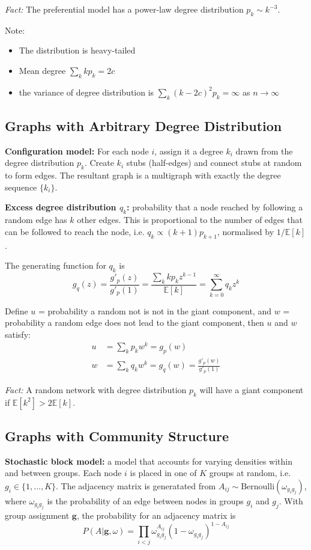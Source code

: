 \documentclass[12pt]{article}
\begin{document}
\textit{Fact:} The preferential model has a power-law degree distribution $p_k \sim k^{-3}$.

Note:
\begin{itemize}
    \item The distribution is heavy-tailed
    \item Mean degree $\sum_k k p_k = 2c$
    \item the variance of degree distribution is $\sum_k (k - 2c)^2 p_k = \infty$ as $n \to \infty$
\end{itemize}

\subsection{Graphs with Arbitrary Degree Distribution}
\textbf{Configuration model:} For each node $i$, assign it a degree $k_i$ drawn from the degree distribution $p_k$. Create $k_i$ stubs (half-edges) and connect stubs at random to form edges. The resultant graph is a multigraph with exactly the degree sequence $\{k_i\}$.

\textbf{Excess degree distribution $q_k$:} probability that a node reached by following a random edge has $k$ other edges. This is proportional to the number of edges that can be followed to reach the node, i.e. $q_k \propto (k + 1)p_{k+1}$, normalised by $1/\mathbb{E}[k]$.

The generating function for $q_k$ is 
$$
g_q(z) = \frac{g'_p(z)}{g'_p(1)} = \frac{\sum_k k p_k z^{k-1}}{\mathbb{E}[k]} = \sum_{k=0}^\infty q_k z^k
$$

Define $u$ = probability a random not is not in the giant component, and $w$ = probability a random edge does not lead to the giant component, then $u$ and $w$ satisfy:
\begin{align*}
    u &= \sum_k p_k w^k = g_p(w) \\
    w &= \sum_k q_k w^k = g_q(w) = \frac{g'_p(w)}{g'_p(1)}
\end{align*}

\textit{Fact:} A random network with degree distribution $p_k$ will have a giant component if $\mathbb{E}[k^2] > 2\mathbb{E}[k]$.

\subsection{Graphs with Community Structure}
\textbf{Stochastic block model:} a model that accounts for varying densities within and between groups. Each node $i$ is placed in one of $K$ groups at random, i.e. $g_i \in \{1, \dots, K\}$. 
The adjacency matrix is generatated from $A_{ij} \sim \text{Bernoulli}(\omega_{g_i g_j})$, where $\omega_{g_i g_j}$ is the probability of an edge between nodes in groups $g_i$ and $g_j$. 
With group assignment $\boldsymbol{g}$, the probability for an adjacency matrix is
$$
P(A| \boldsymbol{g}, \omega) = \prod_{i < j} \omega_{g_i g_j}^{A_{ij}} (1 - \omega_{g_i g_j})^{1 - A_{ij}}
$$
\end{document}
